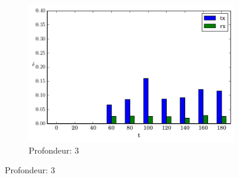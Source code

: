 \begin{figure}[h]
\begin{subfigure}{0.3\textwidth}
    \includegraphics[width=\textwidth]{img/evolution_noinfo_3.pdf}
    \caption{Profondeur: 3}
    \label{supervision:fig:noinfo_3}
  \end{subfigure}


\end{figure}
